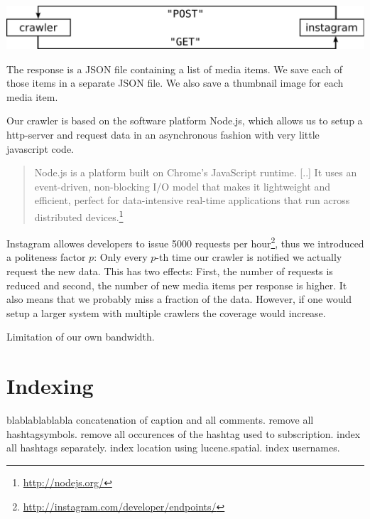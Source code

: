 \documentclass[11pt]{article}
\begin{document}
	\vspace{0.5cm}\includegraphics[width=\textwidth,keepaspectratio]{crawler.pdf}

	The response is a JSON file containing a list of media items. We save each of those items in a separate JSON file. We also save a thumbnail image for each media item.

	Our crawler is based on the software platform Node.js, which allows us to setup a http-server and request data in an asynchronous fashion with very little javascript code.
	\begin{quote}
		Node.js is a platform built on Chrome's JavaScript runtime. [..] It uses an event-driven, non-blocking I/O model that makes it lightweight and efficient, perfect for data-intensive real-time applications that run across distributed devices.\footnote{\url{http://nodejs.org/}}
	\end{quote}

	Instagram allowes developers to issue 5000 requests per hour\footnote{\url{http://instagram.com/developer/endpoints/}}, thus we introduced a politeness factor $p$: Only every $p$-th time our crawler is notified we actually request the new data. This has two effects: First, the number of requests is reduced and second, the number of new media items per response is higher. It also means that we probably miss a fraction of the data. However, if one would setup a larger system with multiple crawlers the coverage would increase.

	Limitation of our own bandwidth.
\section{Indexing}
	blablablablabla
	concatenation of caption and all comments. remove all hashtagsymbols. remove all occurences of the hashtag used to subscription. index all hashtags separately. index location using lucene.spatial. index usernames. 
\end{document}
